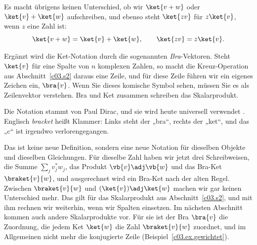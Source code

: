 Es macht übrigens keinen Unterschied, ob wir $\ket{v + w}$ oder $\ket{v} + \ket{w}$
aufschreiben, und ebenso steht $\ket{z v}$ für $z \ket{v}$, wenn $z$ eine Zahl ist:
\begin{equation*}
  \ket{v + w} = \ket{v} + \ket{w} ,
  \qquad
  \ket{z v} = z \ket{v} .
\end{equation*}

Ergänzt wird die Ket-Notation durch die sogenannten \emph{Bra}-Vektoren. Steht $\ket{v}$ für
eine Spalte von $n$ komplexen Zahlen, so macht die Kreuz-Operation aus Abschnitt~\ref{c03.s2}
daraus eine Zeile, und für diese Zeile führen wir ein eigenes Zeichen ein, $\bra{v}$. Wenn Sie
dieses komische Symbol sehen, müssen Sie es als Zeilenvektor verstehen. Bra und Ket zusammen
schreiben das Skalarprodukt.


\begin{historical}
  Die Notation stammt von Paul Dirac, und sie wird heute universell verwendet
  . Englisch \emph{bracket}
  heißt Klammer: Links steht der „bra“, rechts der „ket“, und das „c“ ist irgendwo
  verlorengegangen.
\end{historical}

Das ist keine neue Definition, sondern eine neue Notation für dieselben Objekte und dieselben
Gleichungen. Für dieselbe Zahl haben wir jetzt drei Schreibweisen, die Summe
$\sum_{j} v_j^* w_j$, das Produkt $\vb{v}\adj\vb{w}$ und das Bra-Ket $\braket{v}{w}$, und
ausgerechnet wird ein Bra-Ket nach der alten Regel. Zwischen $\braket{v}{w}$ und
$(\ket{v})\adj \ket{w}$ machen wir gar keinen Unterschied mehr. Das gilt für das Skalarprodukt
aus Abschnitt~\ref{c03.s2}, und mit ihm rechnen wir weiterhin, wenn wir Spalten einsetzen. Im
nächsten Abschnitt kommen auch andere Skalarprodukte vor. Für sie ist der Bra $\bra{v}$ die
Zuordnung, die jedem Ket $\ket{w}$ die Zahl $\braket{v}{w}$ zuordnet, und im Allgemeinen nicht
mehr die konjugierte Zeile (Beispiel~\ref{c03.ex.gewichtet}).

